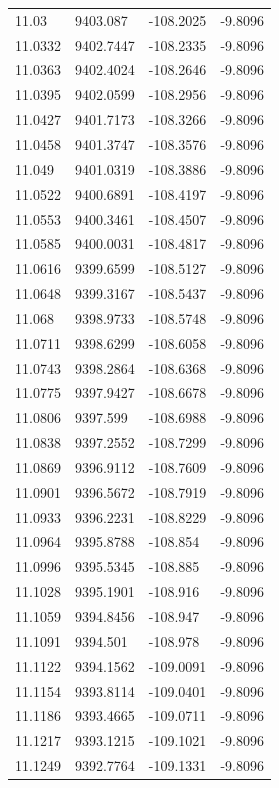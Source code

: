 \begin{table}[H]
\begin{tabular}{llll}
11.03 & 9403.087 & -108.2025 & -9.8096 \\
11.0332 & 9402.7447 & -108.2335 & -9.8096 \\
11.0363 & 9402.4024 & -108.2646 & -9.8096 \\
11.0395 & 9402.0599 & -108.2956 & -9.8096 \\
11.0427 & 9401.7173 & -108.3266 & -9.8096 \\
11.0458 & 9401.3747 & -108.3576 & -9.8096 \\
11.049 & 9401.0319 & -108.3886 & -9.8096 \\
11.0522 & 9400.6891 & -108.4197 & -9.8096 \\
11.0553 & 9400.3461 & -108.4507 & -9.8096 \\
11.0585 & 9400.0031 & -108.4817 & -9.8096 \\
11.0616 & 9399.6599 & -108.5127 & -9.8096 \\
11.0648 & 9399.3167 & -108.5437 & -9.8096 \\
11.068 & 9398.9733 & -108.5748 & -9.8096 \\
11.0711 & 9398.6299 & -108.6058 & -9.8096 \\
11.0743 & 9398.2864 & -108.6368 & -9.8096 \\
11.0775 & 9397.9427 & -108.6678 & -9.8096 \\
11.0806 & 9397.599 & -108.6988 & -9.8096 \\
11.0838 & 9397.2552 & -108.7299 & -9.8096 \\
11.0869 & 9396.9112 & -108.7609 & -9.8096 \\
11.0901 & 9396.5672 & -108.7919 & -9.8096 \\
11.0933 & 9396.2231 & -108.8229 & -9.8096 \\
11.0964 & 9395.8788 & -108.854 & -9.8096 \\
11.0996 & 9395.5345 & -108.885 & -9.8096 \\
11.1028 & 9395.1901 & -108.916 & -9.8096 \\
11.1059 & 9394.8456 & -108.947 & -9.8096 \\
11.1091 & 9394.501 & -108.978 & -9.8096 \\
11.1122 & 9394.1562 & -109.0091 & -9.8096 \\
11.1154 & 9393.8114 & -109.0401 & -9.8096 \\
11.1186 & 9393.4665 & -109.0711 & -9.8096 \\
11.1217 & 9393.1215 & -109.1021 & -9.8096 \\
11.1249 & 9392.7764 & -109.1331 & -9.8096 \\

\end{tabular}
\end{table}
